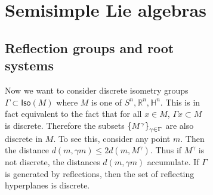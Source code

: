 \documentclass[leqno, openany]{memoir}
\theoremstyle{definition}
\theoremstyle{remark}
\theoremstyle{plain}
\theoremstyle{definition}
\theoremstyle{remark}
\newcommand{\R}{\mathbb{R}}
\renewcommand{\H}{\mathbb{H}}
\begin{document}
\begin{figure}[H]
\begin{figure}[H]
\chapter{Semisimple Lie algebras}%

\section{Reflection groups and root systems}%

Now we want to consider discrete isometry groups $\Gamma \subset
\mathsf{Iso}(M)$ where $M$ is one of $S^n, \R^n, \H^n$. This is in fact
equivalent to the fact that for all $x \in M$, $\Gamma x \subset M$ is
discrete. Therefore the subsets $\qty{M^{\gamma}}_{\gamma \in \Gamma}$ are also
discrete in $M$. To see this, consider any point $m$. Then the distance $d(m,
\gamma m) \leq 2 d(m, M^{\gamma})$. Thus if $M^{\gamma}$ is not discrete, the
distances $d(m, \gamma m)$ accumulate. If $\Gamma$ is generated by reflections,
then the set of reflecting hyperplanes is discrete.


\end{figure}
\end{figure}
\end{document}
